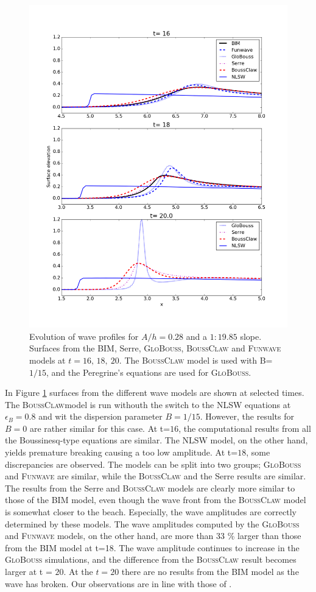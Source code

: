 \documentclass[review]{elsarticle}
\newcommand{\BoussClaw}{\textsc{BoussClaw} }
\newcommand{\BoussClawt}{\textsc{BoussClaw}}
\begin{document}
\begin{figure}[tbh!]
\centering
\includegraphics[width=.9\textwidth]{_fig/bim_boussclaw_fun_glob.png}
\caption{Evolution of wave profiles for $A/h=0.28$ and a $1:19.85$ slope. 
Surfaces from the BIM, Serre, \textsc{GloBouss}, \BoussClaw
and \textsc{Funwave} models at $t = 16,\, 18,\ 20$.
The \BoussClaw model is used with B=$1/15$,
and the Peregrine's equations are used for \textsc{GloBouss}.}
\label{fig:bim_boussclaw_fun}
\end{figure}

In Figure \ref{fig:bim_boussclaw_fun} surfaces from the different
wave models are shown at selected times. 
The \BoussClawt model is run withouth the switch to the NLSW equations at $\epsilon_B=0.8$ and wit the dispersion parameter $B=1/15$. However, the results for  $B=0$
are rather similar for this case. 
At t=$16$, the computational results
from all the Boussinesq-type equations are similar.
The NLSW model, on the other hand, yields premature breaking 
causing a too low amplitude. 
At t=$18$, some discrepancies are observed. The models  
can be split into two groups; 
\textsc{GloBouss} and \textsc{Funwave} 
are similar, while the \BoussClaw
and the Serre results are similar. 
The results from the Serre and \BoussClaw models are clearly
more similar to those of the BIM model, even though the wave front from the \BoussClaw model is somewhat closer to the beach. 
Especially, the wave amplitudes are correctly determined by these models.
The wave amplitudes computed by the \textsc{GloBouss} and \textsc{Funwave} models, on the other hand,
are more than 33 \% 
larger than those from the BIM model at t=18.
The wave amplitude continues to increase in the
\textsc{GloBouss} simulations,
and the difference from the \BoussClaw result 
becomes larger at t = $20$. At the $t=20$ there are no results from the BIM model as  the wave has broken.
Our observations are in line with those of \citet{wei1995fully}.
 
\end{document}
